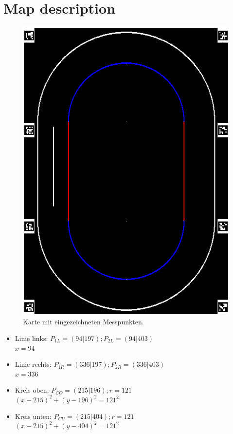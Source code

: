 \documentclass[10pt,oneside,a4paper]{article}
\begin{document}
  \section{Map description}
    \begin{figure}[h]
      \centering
      \includegraphics[scale=0.5]{pictures/map.png}
      \caption{Karte mit eingezeichneten Messpunkten.}
    \end{figure}
    \begin{itemize}
      \item{Linie links:} \( P_{1L} = (94 | 197); P_{2L} = (94 | 403) \) \\
        \( x = 94 \)
      \item{Linie rechts:} \( P_{1R} = (336 | 197); P_{2R} = (336 | 403) \) \\
        \( x = 336 \)
      \item{Kreis oben:} \( P_{CO} = (215 | 196); r = 121 \) \\
        \( (x - 215)^2 + (y - 196)^2 = 121^2 \)
      \item{Kreis unten:} \( P_{CU} = (215 | 404); r = 121 \) \\
        \( (x - 215)^2 + (y - 404)^2 = 121^2 \)
    \end{itemize}
\end{document}
